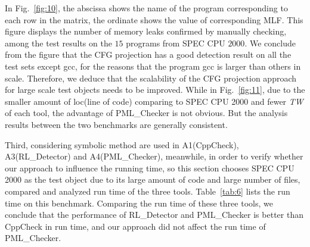 In Fig.~\ref{fig:10}, the abscissa shows the name of the program corresponding to each row in the matrix, the ordinate shows the value of corresponding MLF. This figure displays the number of memory leaks confirmed by manually checking, among the test results on the $15$ programs from SPEC CPU $2000$. We conclude from the figure that the CFG projection has a good detection result on all the test sets except gcc, for the reasons that the program gcc is larger than others in scale. Therefore, we deduce that the scalability of the CFG projection approach for large scale test objects needs to be improved. While in Fig.~\ref{fig:11}, due to the smaller amount of loc(line of code) comparing to SPEC CPU 2000 and fewer \textit{TW} of each tool, the advantage of PML\_Checker is not obvious. But the analysis results between the two benchmarks are generally consistent.

Third, considering symbolic method are used in A1(CppCheck), A3(RL\_Detector) and A4(PML\_Checker), meanwhile, in order to verify whether our approach to influence the running time, so this section chooses SPEC CPU 2000 as the test object due to its large amount of code and large number of files, compared and analyzed run time of the three tools.  Table~\ref{tab:6} lists the run time on this benchmark. Comparing the run time of these three tools, we conclude that the performance of RL\_Detector and PML\_Checker is better than CppCheck in run time, and our approach did not affect the run time of PML\_Checker.

